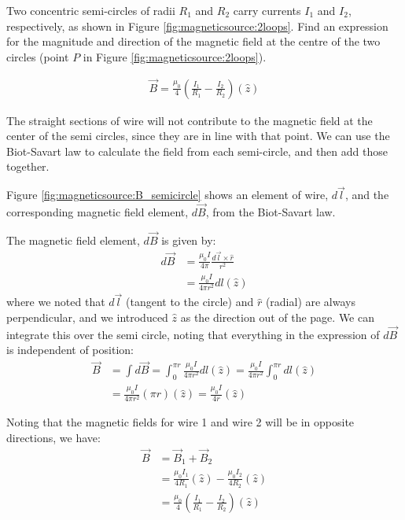 
\question Two concentric semi-circles of radii $R_1$ and $R_2$ carry currents $I_1$ and $I_2$, respectively, as shown in Figure \ref{fig:magneticsource:2loops}. Find an expression for the magnitude and direction of the magnetic field at the centre of the two circles (point $P$ in Figure \ref{fig:magneticsource:2loops}).

\begin{finalanswer}
\begin{align*}
\vec B=\frac{\mu_0}{4}\left( \frac{I_1}{R_1}-\frac{I_2}{R_2} \right)(\hat z)
\end{align*}
\end{finalanswer}

\begin{solution}
The straight sections of wire will not contribute to the magnetic field at the center of the semi circles, since they are in line with that point.  We can use the Biot-Savart law to calculate the field from each semi-circle, and then add those together.

Figure \ref{fig:magneticsource:B_semicircle} shows an element of wire, $d\vec l$, and the corresponding magnetic field element, $d\vec B$, from the Biot-Savart law.

The magnetic field element, $d\vec B$ is given by:
\begin{align*}
d\vec B&=\frac{\mu_0I}{4\pi} \frac{d\vec l\times \hat r}{r^2}\\
&=\frac{\mu_0I}{4\pi r^2}dl (\hat z)
\end{align*}
where we noted that $d\vec l$ (tangent to the circle) and $\hat r$ (radial) are always perpendicular, and we introduced $\hat z$ as the direction out of the page. We can integrate this over the semi circle, noting that everything in the expression of $d\vec B$ is independent of position:
\begin{align*}
\vec B&=\int d\vec B=\int_0^{\pi r}\frac{\mu_0I}{4\pi r^2}dl (\hat z)=\frac{\mu_0I}{4\pi r^2}\int_0^{\pi r}dl (\hat z)\\
&=\frac{\mu_0I}{4\pi r^2}(\pi r)(\hat z)=\frac{\mu_0I}{4 r}(\hat z)
\end{align*}

Noting that the magnetic fields for wire 1 and wire 2 will be in opposite directions, we have:
\begin{align*}
\vec B&=\vec B_1 + \vec B_2\\
&=\frac{\mu_0I_1}{4 R_1}(\hat z)-\frac{\mu_0I_2}{4 R_2}(\hat z)\\
&=\frac{\mu_0}{4}\left( \frac{I_1}{R_1}-\frac{I_2}{R_2} \right)(\hat z)
\end{align*}

\end{solution}


